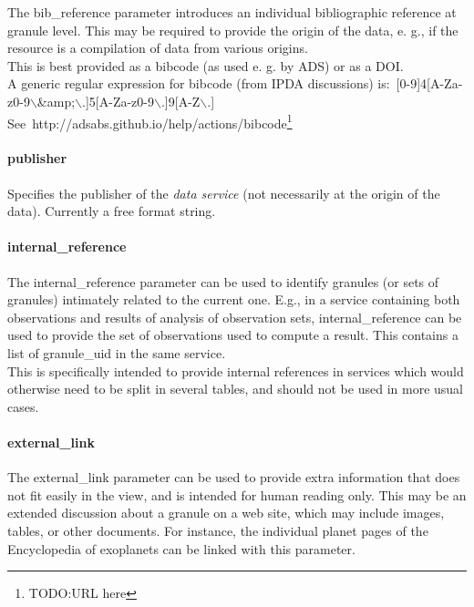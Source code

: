 \documentclass[11pt,a4paper]{ivoa}
\begin{document}
The bib\_reference parameter introduces an individual bibliographic reference at granule level. This may be required to provide the origin of the data, e. g., if the resource is a compilation of data from various origins.\\ This is best provided as a bibcode (as used e. g. by ADS) or as a DOI. \\A generic regular expression for bibcode (from IPDA discussions) is: [0-9]{4}[A-Za-z0-9$\backslash$\&amp;$\backslash$.]{5}[A-Za-z0-9$\backslash$.]{9}[A-Z$\backslash$.]\\See http://adsabs.github.io/help/actions/bibcode\footnote{TODO:URL here}

\paragraph{publisher}

Specifies the publisher of the \emph{data service} (not necessarily at the origin of the data). Currently a free format string.\\

\paragraph{internal\_reference}

The internal\_reference parameter can be used to identify granules (or sets of granules) intimately related to the current one. E.g., in a service containing both observations and results of analysis of observation sets, internal\_reference can be used to provide the set of observations used to compute a result. This contains a list of granule\_uid in the same service.\\This is specifically intended to provide internal references in services which would otherwise need to be split in several tables, and should not be used in more usual cases. 

\paragraph{external\_link}

The external\_link parameter can be used to provide extra information that does not fit easily in the view, and is intended for human reading only. This may be an extended discussion about a granule on a web site, which may include images, tables, or other documents. For instance, the individual planet pages of the Encyclopedia of exoplanets can be linked with this parameter. \\
\end{document}
